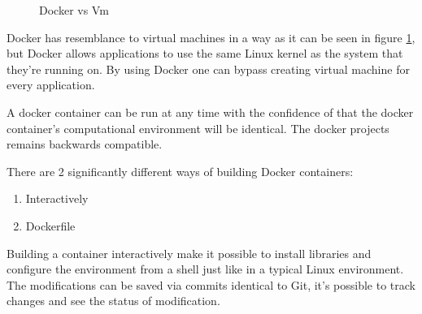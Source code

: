 \begin{figure}[bth]
    \centering
    \qquad
    \caption{Docker vs Vm}
    \label{fig:dockervm}
\end{figure}

Docker has resemblance to virtual machines in a way as it can be seen in figure \ref{fig:dockervm}, but Docker allows applications to use the same Linux kernel as the system that they’re running on. By using Docker one can bypass creating virtual machine for every application. 


A docker container can be run at any time with the confidence of that the docker container’s computational environment will be identical. The docker projects remains backwards compatible. 


There are 2 significantly different ways of building Docker containers:

\begin{enumerate}
	\item Interactively
	\item Dockerfile
\end{enumerate} 

Building a container interactively make it possible to install libraries and configure the environment from a shell just like in a typical Linux environment. The modifications can be saved via commits identical to Git, it’s possible to track changes and see the status of modification.\\  

